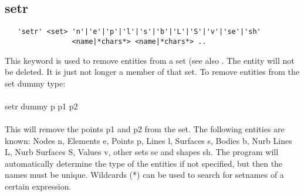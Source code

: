 \documentclass{article}
\begin{document}
\subsection{\label{setr}setr}
\begin{verbatim}
   'setr' <set> 'n'|'e'|'p'|'l'|'s'|'b'|'L'|'S'|'v'|'se'|'sh'
                <name|*chars*> <name|*chars*> .. 
\end{verbatim}
This keyword is used to remove entities from a set (see also . The entity will not be deleted. It is just not longer a member of that set. To remove entities from the set dummy type:\\\\setr dummy p p1 p2\\\\This will remove the points p1 and p2 from the set. The following entities are known: Nodes n, Elements e, Points p, Lines l, Surfaces s, Bodies b, Nurb Lines L, Nurb Surfaces S, Values v, other sets se and shapes sh. The program will automatically determine the type of the entities if not specified, but then the names must be unique. Wildcards (*) can be used to search for setnames of a certain expression.
\end{document}
